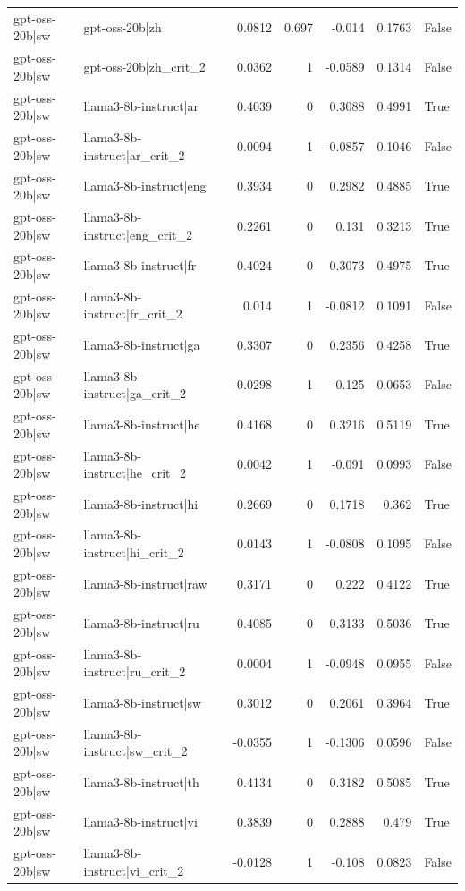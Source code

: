 \begin{table}
\begin{tabular}{l l r r r r l}
gpt-oss-20b|sw & gpt-oss-20b|zh & 0.0812 & 0.697 & -0.014 & 0.1763 & False \\
gpt-oss-20b|sw & gpt-oss-20b|zh_crit_2 & 0.0362 & 1 & -0.0589 & 0.1314 & False \\
gpt-oss-20b|sw & llama3-8b-instruct|ar & 0.4039 & 0 & 0.3088 & 0.4991 & True \\
gpt-oss-20b|sw & llama3-8b-instruct|ar_crit_2 & 0.0094 & 1 & -0.0857 & 0.1046 & False \\
gpt-oss-20b|sw & llama3-8b-instruct|eng & 0.3934 & 0 & 0.2982 & 0.4885 & True \\
gpt-oss-20b|sw & llama3-8b-instruct|eng_crit_2 & 0.2261 & 0 & 0.131 & 0.3213 & True \\
gpt-oss-20b|sw & llama3-8b-instruct|fr & 0.4024 & 0 & 0.3073 & 0.4975 & True \\
gpt-oss-20b|sw & llama3-8b-instruct|fr_crit_2 & 0.014 & 1 & -0.0812 & 0.1091 & False \\
gpt-oss-20b|sw & llama3-8b-instruct|ga & 0.3307 & 0 & 0.2356 & 0.4258 & True \\
gpt-oss-20b|sw & llama3-8b-instruct|ga_crit_2 & -0.0298 & 1 & -0.125 & 0.0653 & False \\
gpt-oss-20b|sw & llama3-8b-instruct|he & 0.4168 & 0 & 0.3216 & 0.5119 & True \\
gpt-oss-20b|sw & llama3-8b-instruct|he_crit_2 & 0.0042 & 1 & -0.091 & 0.0993 & False \\
gpt-oss-20b|sw & llama3-8b-instruct|hi & 0.2669 & 0 & 0.1718 & 0.362 & True \\
gpt-oss-20b|sw & llama3-8b-instruct|hi_crit_2 & 0.0143 & 1 & -0.0808 & 0.1095 & False \\
gpt-oss-20b|sw & llama3-8b-instruct|raw & 0.3171 & 0 & 0.222 & 0.4122 & True \\
gpt-oss-20b|sw & llama3-8b-instruct|ru & 0.4085 & 0 & 0.3133 & 0.5036 & True \\
gpt-oss-20b|sw & llama3-8b-instruct|ru_crit_2 & 0.0004 & 1 & -0.0948 & 0.0955 & False \\
gpt-oss-20b|sw & llama3-8b-instruct|sw & 0.3012 & 0 & 0.2061 & 0.3964 & True \\
gpt-oss-20b|sw & llama3-8b-instruct|sw_crit_2 & -0.0355 & 1 & -0.1306 & 0.0596 & False \\
gpt-oss-20b|sw & llama3-8b-instruct|th & 0.4134 & 0 & 0.3182 & 0.5085 & True \\
gpt-oss-20b|sw & llama3-8b-instruct|vi & 0.3839 & 0 & 0.2888 & 0.479 & True \\
gpt-oss-20b|sw & llama3-8b-instruct|vi_crit_2 & -0.0128 & 1 & -0.108 & 0.0823 & False \\

\end{tabular}
\end{table}
